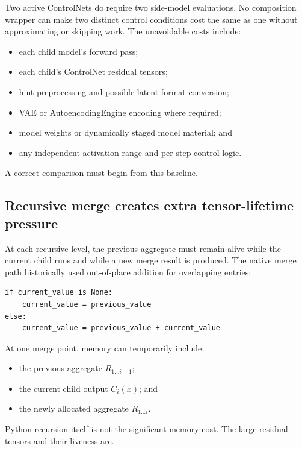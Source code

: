 \documentclass[11pt]{article}
\begin{document}
Two active ControlNets do require two side-model evaluations. No composition wrapper can make two distinct control conditions cost the same as one without approximating or skipping work. The unavoidable costs include:

\begin{itemize}
  \item each child model’s forward pass;
  \item each child’s ControlNet residual tensors;
  \item hint preprocessing and possible latent-format conversion;
  \item VAE or AutoencodingEngine encoding where required;
  \item model weights or dynamically staged model material; and
  \item any independent activation range and per-step control logic.
\end{itemize}

A correct comparison must begin from this baseline.

\subsection{Recursive merge creates extra tensor-lifetime pressure}

At each recursive level, the previous aggregate must remain alive while the current child runs and while a new merge result is produced. The native merge path historically used out-of-place addition for overlapping entries:

\begin{lstlisting}[style=pythonstyle,caption={Conceptual native merge allocation.}]
if current_value is None:
    current_value = previous_value
else:
    current_value = previous_value + current_value
\end{lstlisting}

At one merge point, memory can temporarily include:

\begin{itemize}
  \item the previous aggregate $R_{1\ldots i-1}$;
  \item the current child output $C_i(x)$; and
  \item the newly allocated aggregate $R_{1\ldots i}$.
\end{itemize}

Python recursion itself is not the significant memory cost. The large residual tensors and their liveness are.
\end{document}
